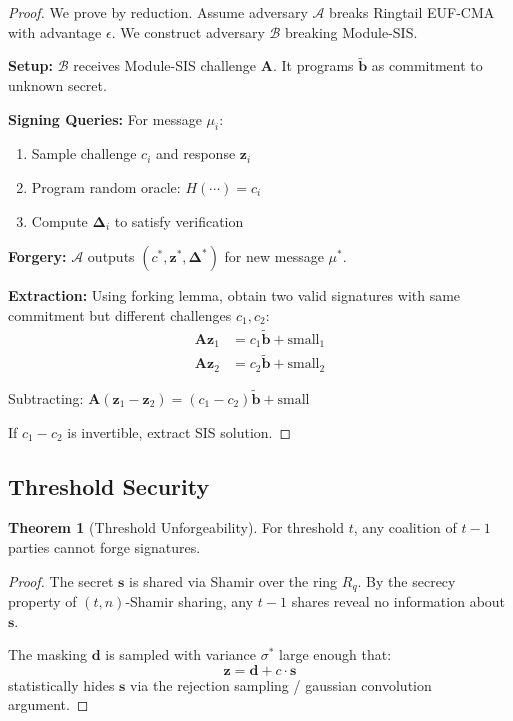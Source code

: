 \documentclass[11pt,a4paper]{article}
\theoremstyle{definition}
\newtheorem{theorem}{Theorem}
\begin{document}
\begin{proof}
We prove by reduction. Assume adversary $\mathcal{A}$ breaks Ringtail EUF-CMA with advantage $\epsilon$. We construct adversary $\mathcal{B}$ breaking Module-SIS.

\textbf{Setup:} $\mathcal{B}$ receives Module-SIS challenge $\mathbf{A}$. It programs $\tilde{\mathbf{b}}$ as commitment to unknown secret.

\textbf{Signing Queries:} For message $\mu_i$:
\begin{enumerate}
\item Sample challenge $c_i$ and response $\mathbf{z}_i$
\item Program random oracle: $H(\cdots) = c_i$
\item Compute $\boldsymbol{\Delta}_i$ to satisfy verification
\end{enumerate}

\textbf{Forgery:} $\mathcal{A}$ outputs $(c^*, \mathbf{z}^*, \boldsymbol{\Delta}^*)$ for new message $\mu^*$.

\textbf{Extraction:} Using forking lemma, obtain two valid signatures with same commitment but different challenges $c_1, c_2$:
\begin{align*}
\mathbf{A}\mathbf{z}_1 &= c_1 \tilde{\mathbf{b}} + \text{small}_1 \\
\mathbf{A}\mathbf{z}_2 &= c_2 \tilde{\mathbf{b}} + \text{small}_2
\end{align*}

Subtracting: $\mathbf{A}(\mathbf{z}_1 - \mathbf{z}_2) = (c_1 - c_2)\tilde{\mathbf{b}} + \text{small}$

If $c_1 - c_2$ is invertible, extract SIS solution.
\end{proof}

\subsection{Threshold Security}

\begin{theorem}[Threshold Unforgeability]
For threshold $t$, any coalition of $t-1$ parties cannot forge signatures.
\end{theorem}

\begin{proof}
The secret $\mathbf{s}$ is shared via Shamir over the ring $R_q$. By the secrecy property of $(t, n)$-Shamir sharing, any $t-1$ shares reveal no information about $\mathbf{s}$.

The masking $\mathbf{d}$ is sampled with variance $\sigma^*$ large enough that:
\[
\mathbf{z} = \mathbf{d} + c \cdot \mathbf{s}
\]
statistically hides $\mathbf{s}$ via the rejection sampling / gaussian convolution argument.
\end{proof}
\end{document}
